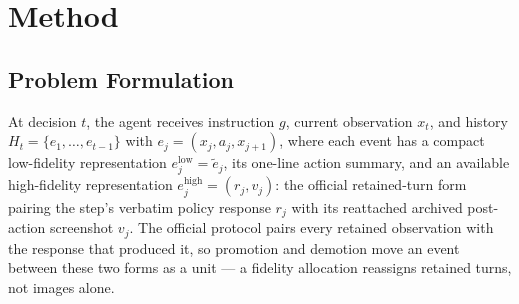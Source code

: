 \documentclass[letterpaper]{article} %
\begin{document}
\section{Method}

\subsection{Problem Formulation}

At decision $t$, the agent receives instruction $g$, current observation
$x_t$, and history $H_t=\{e_1,\ldots,e_{t-1}\}$ with
$e_j=(x_j,a_j,x_{j+1})$, where each event has a compact low-fidelity
representation
$e_j^{\mathrm{low}}=\tilde e_j$, its one-line action summary, and an
available high-fidelity representation $e_j^{\mathrm{high}}=(r_j,v_j)$: the
official retained-turn form pairing the step's verbatim policy response
$r_j$ with its reattached archived post-action screenshot $v_j$. The
official protocol pairs every retained observation with the response that
produced it, so promotion and demotion move an event between these two
forms as a unit --- a fidelity allocation reassigns retained turns, not
images alone.
\end{document}
